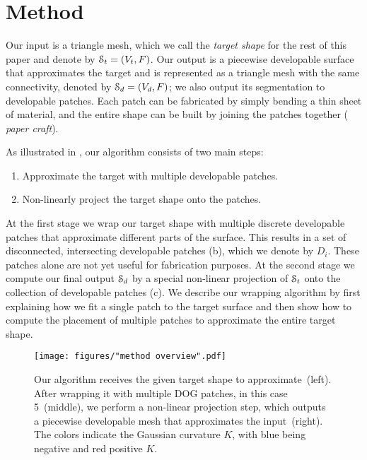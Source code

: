 


\section{Method}
\label{sec:method}


Our input is a triangle mesh, which we  call the \emph{target shape} for the rest of this paper and denote by $\mathcal{S}_t = (V_t,F)$. Our output is a piecewise developable surface that approximates the target and is represented as a triangle mesh with the same connectivity, denoted by $\mathcal{S}_d = (V_d,F)$; we also output its segmentation to developable patches. Each patch can be fabricated by simply bending a thin sheet of material, and the entire shape can be built by joining the patches together ( \emph{paper craft}). 

As illustrated in , our algorithm consists of two main steps: 
\begin{enumerate}
	\item Approximate the target with multiple developable patches.
	\item Non-linearly project the target shape onto the patches.
\end{enumerate}
%
At the first stage we wrap our target shape with multiple discrete developable patches that approximate different parts of the surface. This results in a set of disconnected,  intersecting developable patches (b), which we denote by $D_i$. These patches  alone are not yet useful for fabrication purposes. At the second stage we compute our final output $\mathcal{S}_d$ 
by a special non-linear projection of $\mathcal{S}_t$ onto the collection of developable patches (c). We describe our wrapping algorithm by first explaining how we fit a single patch to the target surface and then show how to compute the placement of multiple patches to approximate the entire target shape.


\begin{figure} [h!]
	\vspace{10pt}
	\centering
	\noindent\texttt{[image: figures/"method overview".pdf]}
	\caption{
		Our algorithm receives the given target shape to approximate~(left). After wrapping it with multiple DOG patches, in this case 5~(middle), we perform a non-linear projection step, which outputs a piecewise developable mesh that approximates the input~(right). The colors indicate the Gaussian curvature $K$, with blue being negative and red positive $K$. 
\label{fig:algorithm_overview}}
\end{figure}
	

